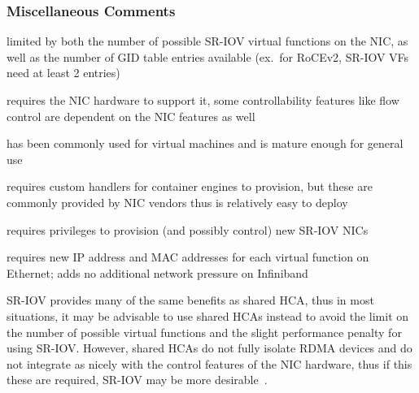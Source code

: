 \documentclass[12pt,titlepage]{article}
\begin{document}
\subsubsection*{Miscellaneous Comments}
\begin{description}[nolistsep,font={{\scshape\bfseries}}]
	\item[Scalability Limits] limited by both the number of possible SR-IOV virtual functions on the NIC, as well as the number of GID table entries available (ex.\ for RoCEv2, SR-IOV VFs need at least 2 entries)
	\item[Proprietary] requires the NIC hardware to support it, some controllability features like flow control are dependent on the NIC features as well
	\item[Maturity] has been commonly used for virtual machines and is mature enough for general use
	\item[Ease in Deployment] requires custom handlers for container engines to provision, but these are commonly provided by NIC vendors thus is relatively easy to deploy
	\item[Execution Privileges] requires privileges to provision (and possibly control) new SR-IOV NICs
	\item[Network Pressure] requires new IP address and MAC addresses for each virtual function on Ethernet; adds no additional network pressure on Infiniband
\end{description}

SR-IOV provides many of the same benefits as shared HCA, thus in most situations, it may be advisable to use shared HCAs instead to avoid the limit on the number of possible virtual functions and the slight performance penalty for using SR-IOV\@.
However, shared HCAs do not fully isolate RDMA devices and do not integrate as nicely with the control features of the NIC hardware, thus if this these are required, SR-IOV may be more desirable~\cite{mlnxofedmanual,mellanoxdockersriov}.
\end{document}
